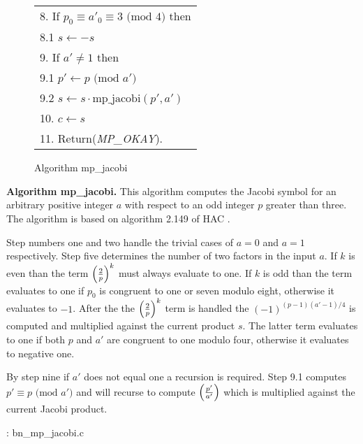 \documentclass[b5paper]{book}
\begin{document}
\begin{figure}[!here]
\begin{small}
\begin{center}
\begin{tabular}{l}
8.  If $p_0 \equiv a'_0 \equiv 3 \mbox{ (mod }4\mbox{)}$ then \\
\hspace{3mm}8.1  $s \leftarrow -s$ \\
9.  If $a' \ne 1$ then \\
\hspace{3mm}9.1  $p' \leftarrow p \mbox{ (mod }a'\mbox{)}$ \\
\hspace{3mm}9.2  $s \leftarrow s \cdot \mbox{mp\_jacobi}(p', a')$ \\
10.  $c \leftarrow s$ \\
11.  Return(\textit{MP\_OKAY}). \\
\hline
\end{tabular}
\end{center}
\end{small}
\caption{Algorithm mp\_jacobi}
\end{figure}
\textbf{Algorithm mp\_jacobi.}
This algorithm computes the Jacobi symbol for an arbitrary positive integer $a$ with respect to an odd integer $p$ greater than three.  The algorithm
is based on algorithm 2.149 of HAC \cite[pp. 73]{HAC}.  

Step numbers one and two handle the trivial cases of $a = 0$ and $a = 1$ respectively.  Step five determines the number of two factors in the
input $a$.  If $k$ is even than the term $\left ( { 2 \over p } \right )^k$ must always evaluate to one.  If $k$ is odd than the term evaluates to one 
if $p_0$ is congruent to one or seven modulo eight, otherwise it evaluates to $-1$. After the the $\left ( { 2 \over p } \right )^k$ term is handled 
the $(-1)^{(p-1)(a'-1)/4}$ is computed and multiplied against the current product $s$.  The latter term evaluates to one if both $p$ and $a'$ 
are congruent to one modulo four, otherwise it evaluates to negative one.

By step nine if $a'$ does not equal one a recursion is required.  Step 9.1 computes $p' \equiv p \mbox{ (mod }a'\mbox{)}$ and will recurse to compute
$\left ( {p' \over a'} \right )$ which is multiplied against the current Jacobi product.

\vspace{+3mm}\begin{small}
\hspace{-5.1mm}{\bf File}: bn\_mp\_jacobi.c
\vspace{-3mm}
\begin{alltt}
\end{alltt}
\end{small}
\end{document}
